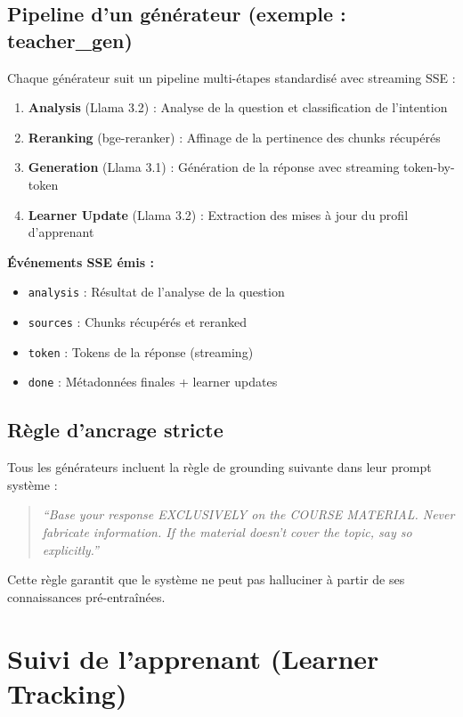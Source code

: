 \documentclass[12pt,a4paper]{article}
\begin{document}
\subsection{Pipeline d'un générateur (exemple : teacher\_gen)}

Chaque générateur suit un pipeline multi-étapes standardisé avec streaming SSE :

\begin{enumerate}
    \item \textbf{Analysis} (Llama 3.2) : Analyse de la question et classification de l'intention
    \item \textbf{Reranking} (bge-reranker) : Affinage de la pertinence des chunks récupérés
    \item \textbf{Generation} (Llama 3.1) : Génération de la réponse avec streaming token-by-token
    \item \textbf{Learner Update} (Llama 3.2) : Extraction des mises à jour du profil d'apprenant
\end{enumerate}

\textbf{Événements SSE émis :}
\begin{itemize}
    \item \texttt{analysis} : Résultat de l'analyse de la question
    \item \texttt{sources} : Chunks récupérés et reranked
    \item \texttt{token} : Tokens de la réponse (streaming)
    \item \texttt{done} : Métadonnées finales + learner updates
\end{itemize}

\subsection{Règle d'ancrage stricte}

Tous les générateurs incluent la règle de grounding suivante dans leur prompt système :

\begin{quote}
\textit{``Base your response EXCLUSIVELY on the COURSE MATERIAL. Never fabricate information. If the material doesn't cover the topic, say so explicitly.''}
\end{quote}

Cette règle garantit que le système ne peut pas halluciner à partir de ses connaissances pré-entraînées.

\section{Suivi de l'apprenant (Learner Tracking)}
\end{document}
